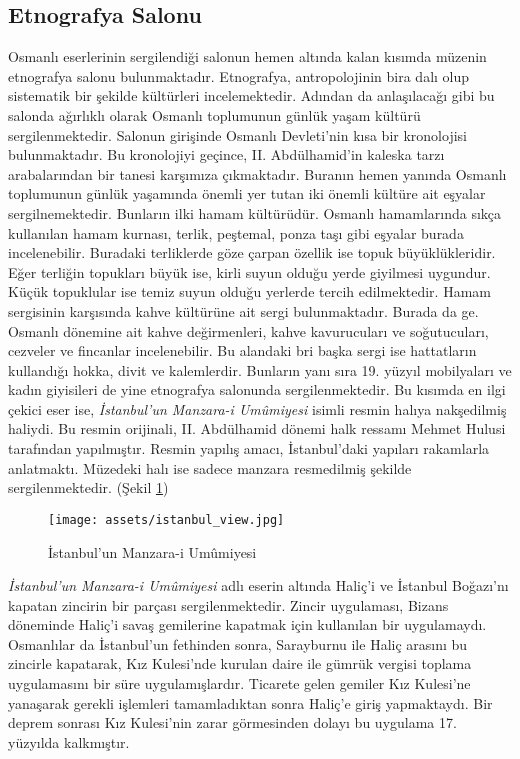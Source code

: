 \subsection{Etnografya Salonu}
\indent\indent Osmanlı eserlerinin sergilendiği salonun hemen altında kalan kısımda müzenin etnografya salonu bulunmaktadır. Etnografya, antropolojinin bira dalı olup sistematik bir şekilde kültürleri incelemektedir. Adından da anlaşılacağı gibi bu salonda ağırlıklı olarak Osmanlı toplumunun günlük yaşam kültürü sergilenmektedir. Salonun girişinde Osmanlı Devleti'nin kısa bir kronolojisi bulunmaktadır. Bu kronolojiyi geçince, II. Abdülhamid'in kaleska tarzı arabalarından bir tanesi karşımıza çıkmaktadır. Buranın hemen yanında Osmanlı toplumunun günlük yaşamında önemli yer tutan iki önemli kültüre ait eşyalar sergilnemektedir. Bunların ilki hamam kültürüdür. Osmanlı hamamlarında sıkça kullanılan hamam kurnası, terlik, peştemal, ponza taşı gibi eşyalar burada incelenebilir. Buradaki terliklerde göze çarpan özellik ise topuk büyüklükleridir. Eğer terliğin topukları büyük ise, kirli suyun olduğu yerde giyilmesi uygundur. Küçük topuklular ise temiz suyun olduğu yerlerde tercih edilmektedir. Hamam sergisinin karşısında kahve kültürüne ait sergi bulunmaktadır. Burada da ge. Osmanlı dönemine ait kahve değirmenleri, kahve kavurucuları ve soğutucuları, cezveler ve fincanlar incelenebilir. Bu alandaki bri başka sergi ise hattatların kullandığı hokka, divit ve kalemlerdir. Bunların yanı sıra 19. yüzyıl mobilyaları ve kadın giyisileri de yine etnografya salonunda sergilenmektedir.\newline
\indent Bu kısımda en ilgi çekici eser ise, \textit{İstanbul'un Manzara-i Umûmiyesi} isimli resmin halıya nakşedilmiş haliydi. Bu resmin orijinali, II. Abdülhamid dönemi halk ressamı Mehmet Hulusi tarafından yapılmıştır. Resmin yapılış amacı, İstanbul'daki yapıları rakamlarla anlatmaktı. Müzedeki halı ise sadece manzara resmedilmiş şekilde sergilenmektedir. (Şekil \ref{fig:istanbul_view})\newline
\begin{figure}[H]
    \centering
    \texttt{[image: assets/istanbul\_view.jpg]}
    \caption{İstanbul'un Manzara-i Umûmiyesi}
    \label{fig:istanbul_view}
\end{figure}
\indent \textit{İstanbul'un Manzara-i Umûmiyesi} adlı eserin altında Haliç'i ve İstanbul Boğazı'nı kapatan zincirin bir parçası sergilenmektedir. Zincir uygulaması, Bizans döneminde Haliç'i savaş gemilerine kapatmak için kullanılan bir uygulamaydı. Osmanlılar da İstanbul'un fethinden sonra, Sarayburnu ile Haliç arasını bu zincirle kapatarak, Kız Kulesi'nde kurulan daire ile gümrük vergisi toplama uygulamasını bir süre uygulamışlardır. Ticarete gelen gemiler Kız Kulesi'ne yanaşarak gerekli işlemleri tamamladıktan sonra Haliç'e giriş yapmaktaydı. Bir deprem sonrası Kız Kulesi'nin zarar görmesinden dolayı bu uygulama 17. yüzyılda kalkmıştır.